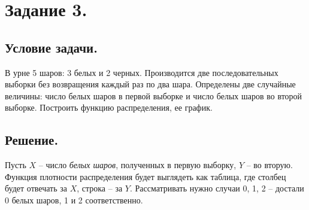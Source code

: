 \documentclass[a4paper, 12pt]{article}
\begin{document}
    \section{Задание 3.}
    \subsection{Условие задачи.}
    В урне 5 шаров: 3 белых и 2 черных. Производится две
    последовательных выборки без возвращения каждый раз по два шара.
    Определены две случайные величины: число белых шаров в первой
    выборке и число белых шаров во второй выборке. Построить функцию
    распределения, ее график.


    \subsection{Решение.}
    Пусть $X$ -- число \textit{белых шаров}, полученных в первую выборку, $Y$ -- во вторую.
    Функция плотности распределения будет выглядеть как таблица, где столбец будет отвечать за
    $X$, строка -- за $Y$. Рассматривать нужно случаи 0, 1, 2 -- достали 0 белых шаров, 1 и 2
    соответственно.
\end{document}
